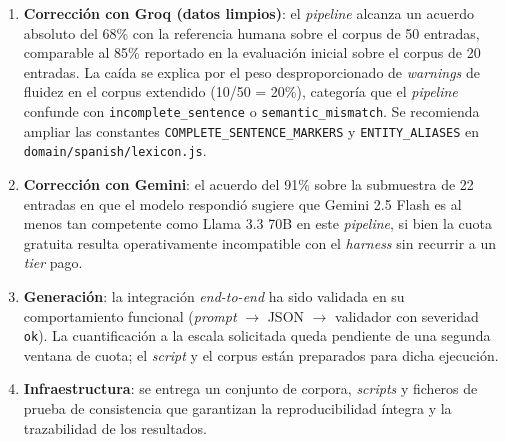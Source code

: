\begin{enumerate}
	\item \textbf{Corrección con Groq (datos limpios)}: el \textit{pipeline} alcanza un
	      acuerdo absoluto del 68\% con la referencia humana sobre el corpus de 50
	      entradas, comparable al 85\% reportado en la evaluación inicial sobre el corpus
	      de 20 entradas. La caída se explica por el peso desproporcionado de
	      \textit{warnings} de fluidez en el corpus extendido (10/50 = 20\%), categoría
	      que el \textit{pipeline} confunde con \texttt{incomplete\_sentence} o
	      \texttt{semantic\_mismatch}. Se recomienda ampliar las constantes
	      \texttt{COMPLETE\_SENTENCE\_MARKERS} y \texttt{ENTITY\_ALIASES} en
	      \texttt{domain/spanish/lexicon.js}.

	\item \textbf{Corrección con Gemini}: el acuerdo del 91\% sobre la submuestra de 22
	      entradas en que el modelo respondió sugiere que Gemini 2.5 Flash es al menos
	      tan competente como Llama 3.3 70B en este \textit{pipeline}, si bien la cuota
	      gratuita resulta operativamente incompatible con el \textit{harness} sin
	      recurrir a un \textit{tier} pago.

	\item \textbf{Generación}: la integración \textit{end-to-end} ha sido validada en su
	      comportamiento funcional (\textit{prompt} $\rightarrow$ JSON $\rightarrow$
	      validador con severidad \texttt{ok}). La cuantificación a la escala solicitada
	      queda pendiente de una segunda ventana de cuota; el \textit{script} y el corpus
	      están preparados para dicha ejecución.

	\item \textbf{Infraestructura}: se entrega un conjunto de corpora, \textit{scripts} y
	      ficheros de prueba de consistencia que garantizan la reproducibilidad íntegra y la
	      trazabilidad de los resultados.
\end{enumerate}

